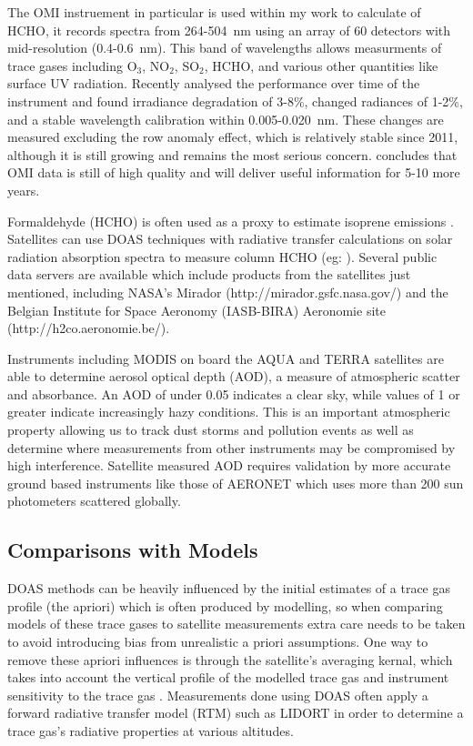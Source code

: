     The OMI instruement in particular is used within my work to calculate of HCHO, it records spectra from 264-504~nm using an array of 60 detectors with mid-resolution (0.4-0.6~nm).
    This band of wavelengths allows measurments of trace gases including O$_3$, NO$_2$, SO$_2$, HCHO, and various other quantities like surface UV radiation. 
    Recently \cite{Schenkeveld2017} analysed the performance over time of the instrument and found irradiance degradation of 3-8\%, changed radiances of 1-2\%, and a stable wavelength calibration within 0.005-0.020~nm.
    These changes are measured excluding the row anomaly effect, which is relatively stable since 2011, although it is still growing and remains the most serious concern.
    \cite{Schenkeveld2017} concludes that OMI data is still of high quality and will deliver useful information for 5-10 more years.
    
    Formaldehyde (HCHO) is often used as a proxy to estimate isoprene emissions \citep{Marais2012,bauwens2013satellite}.
    Satellites can use DOAS techniques with radiative transfer calculations on solar radiation absorption spectra to measure column HCHO (eg: \citet{Leue2001}).
    Several public data servers are available which include products from the satellites just mentioned, including NASA's Mirador (http://mirador.gsfc.nasa.gov/) and the Belgian Institute for Space Aeronomy (IASB-BIRA) Aeronomie site (http://h2co.aeronomie.be/).

    Instruments including MODIS on board the AQUA and TERRA satellites are able to determine aerosol optical depth (AOD), a measure of atmospheric scatter and absorbance. 
    An AOD of under 0.05 indicates a clear sky, while values of 1 or greater indicate increasingly hazy conditions.
    This is an important atmospheric property allowing us to track dust storms and pollution events as well as determine where measurements from other instruments may be compromised by high interference.
    Satellite measured AOD requires validation by more accurate ground based instruments like those of AERONET which uses more than 200 sun photometers scattered globally. 
  
  \subsection{Comparisons with Models}
  
    DOAS methods can be heavily influenced by the initial estimates of a trace gas profile (the apriori) which is often produced by modelling, so when comparing models of these trace gases to satellite measurements extra care needs to be taken to avoid introducing bias from unrealistic a priori assumptions.
    One way to remove these apriori influences is through the satellite's averaging kernal, which takes into account the vertical profile of the modelled trace gas and instrument sensitivity to the trace gas \citep{Eskes2003, Palmer2001}.
    Measurements done using DOAS often apply a forward radiative transfer model (RTM) such as LIDORT in order to determine a trace gas's radiative properties at various altitudes.
  
